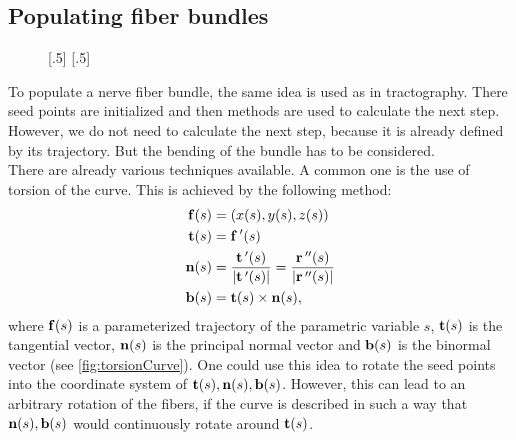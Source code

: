 \subsection{Populating fiber bundles}\label{sec:fillBundle}
% 
\begin{figure}[!t]
    \centering
    [.5\textwidth-4.3pt]{
    \setlength{\tikzwidth}{0.5\textwidth - 4.3pt}
    }\hfill
    [.5\textwidth-4.3pt]{
    }
	\caption{}
\end{figure}
% 
To populate a nerve fiber bundle, the same idea is used as in tractography.
There seed points are initialized and then \dummy methods are used to calculate the next step.
However, we do not need to calculate the next step, because it is already defined by its trajectory.
But the bending of the bundle has to be considered.
\\
% 
There are already various techniques available.
A common one is the use of torsion of the curve. This is achieved by the following method:
% 
\begin{align}
\begin{split}
\mathbf{f}(s) &= (x(s),y(s),z(s)) \\
\mathbf{t}(s) &= \mathbf{f}\,'(s) \\
\mathbf{n}(s) &= \frac{\mathbf{t}\,'(s)}{|\mathbf{t}\,'(s)|} = \frac{\mathbf{r}\,''(s)}{|\mathbf{r}\,''(s)|} \\
\mathbf{b}(s) &= \mathbf{t}(s) \times \mathbf{n}(s),
\end{split}
\end{align}
% 
where $\mathbf{f}(s)$ is a parameterized trajectory of the parametric variable $s$, $\mathbf{t}(s)$ is the tangential vector, $\mathbf{n}(s)$ is the principal normal vector and $\mathbf{b}(s)$ is the binormal vector (see \cref{fig:torsionCurve}).
One could use this idea to rotate the seed points into the coordinate system of $\mathbf{t}(s),\mathbf{n}(s),\mathbf{b}(s)$.
However, this can lead to an arbitrary rotation of the fibers, \eg if the curve is described in such a way that $\mathbf{n}(s),\mathbf{b}(s)$ would continuously rotate around $\mathbf{t}(s)$.
\\
